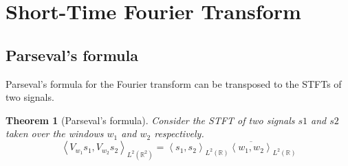 \documentclass[
  american,
]{article}
\newtheorem{theorem}{Theorem}
\begin{document}
\pagebreak

\hypertarget{appendix-appendix}{%
\appendix}


\hypertarget{istft}{%
\section{Short-Time Fourier Transform}\label{istft}}

\hypertarget{parsevals-formula}{%
\subsection{Parseval's formula}\label{parsevals-formula}}

Parseval's formula for the Fourier transform can be transposed
to the STFTs of two signals.

\begin{theorem}[Parseval's formula]
\protect\hypertarget{thm:parseval}{}\label{thm:parseval}Consider the STFT of two signals \(s1\) and \(s2\) taken over
the windows \(w_1\) and \(w_2\) respectively.
\begin{equation}
\left\langle V_{w_1}s_1,V_{w_2}s_2\right\rangle_{L^2(\mathbb{R}^2)} =
    \left\langle s_1,s_2\right\rangle_{L^2(\mathbb{R})} \overline{\left\langle w_1,w_2\right\rangle}_{L^2(\mathbb{R})}
\end{equation}
\end{theorem}
\end{document}
